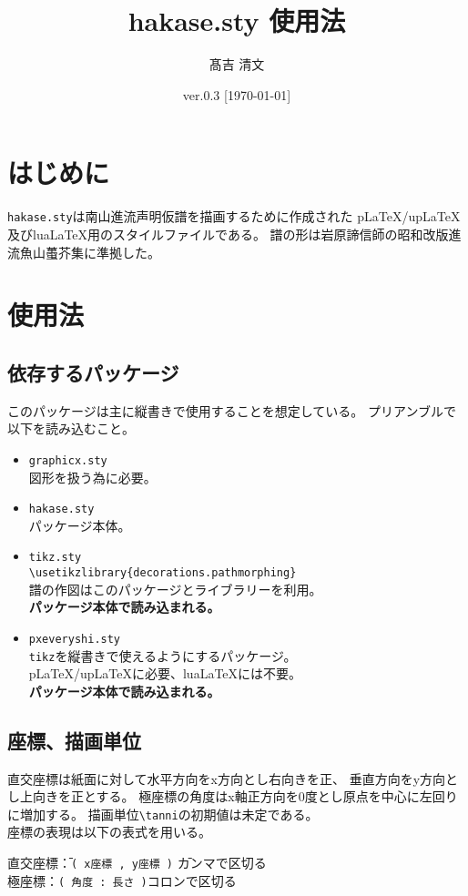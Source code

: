 \documentclass[a4paper,luatex]{l3doc}
\title{hakase.sty 使用法}
\author{髙吉 清文}
\date{ver.0.3 [\today]}
\begin{document}
\maketitle
\section{はじめに}
\verb|hakase.sty|は南山進流声明仮譜を描画するために作成された
p\LaTeX/up\LaTeX 及びlua\LaTeX 用のスタイルファイルである。
譜の形は岩原諦信師の昭和改版進流魚山蠆芥集に準拠した。
\section{使用法}
\subsection{依存するパッケージ}
このパッケージは主に縦書きで使用することを想定している。
プリアンブルで以下を読み込むこと。
\begin{itemize}
 \item \verb|graphicx.sty|\\
       図形を扱う為に必要。
 \item \verb|hakase.sty|\\
       パッケージ本体。
 \item \verb|tikz.sty|\\
       \verb|\usetikzlibrary{decorations.pathmorphing}|\\
       譜の作図はこのパッケージとライブラリーを利用。\\
       \textbf{パッケージ本体で読み込まれる。}
 \item \verb|pxeveryshi.sty|\\
       \verb|tikz|を縦書きで使えるようにするパッケージ。\\
       p\LaTeX/up\LaTeX に必要、lua\LaTeX には不要。\\
       \textbf{パッケージ本体で読み込まれる。}
\end{itemize}
\subsection{座標、描画単位}
直交座標は紙面に対して水平方向をx方向とし右向きを正、
垂直方向をy方向とし上向きを正とする。
極座標の角度はx軸正方向を0度とし原点を中心に左回りに増加する。
描画単位\verb|\tanni|の初期値は未定である。\\
座標の表現は以下の表式を用いる。
\begin{tabbing}
直交座標\=：\=\verb|( x座標 , y座標 )|  \=カンマで区切る \\
極座標\>：\>\verb|( 角度 : 長さ )|\>コロンで区切る	
\end{tabbing}
\end{document}
